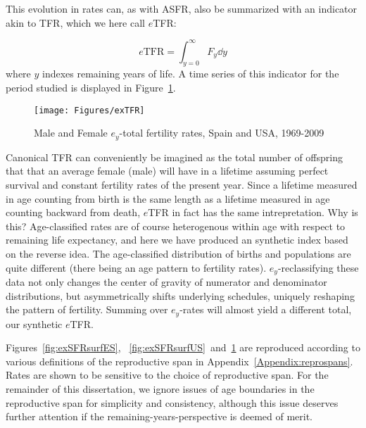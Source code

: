  \FloatBarrier
This evolution in rates can, as with ASFR, also be
summarized with an indicator akin to TFR, which we here call $e$TFR:

\begin{equation}
\label{eq:exTFR}
e\mathrm{TFR} = \int _{y=0}^\infty F_y \dd y
\end{equation}
where $y$ indexes remaining years of life. A time series of this indicator
for the period studied is displayed in Figure~\ref{fig:exTFR}.

\begin{figure}[ht!]
        \centering  
          \caption{Male and Female $e_y$-total fertility rates, Spain
          and USA, 1969-2009}
           \texttt{[image: Figures/exTFR]}
          \label{fig:exTFR}
\end{figure}
Canonical TFR can conveniently be imagined as the total number of
offspring that that an average female (male) will have in a lifetime assuming
perfect survival and constant fertility rates of the present year.
Since a lifetime measured in age counting from birth is the same length as a
lifetime measured in age counting backward from death, $e$TFR in fact has the
same intrepretation. Why is this? Age-classified rates are of course
heterogenous within age with respect to remaining life expectancy, and here we have produced
an synthetic index based on the reverse idea. The age-classified
distribution of births and populations are quite different (there being an age
pattern to fertility rates). $e_y$-reclassifying these data not only changes the
center of gravity of numerator and denominator distributions, but asymmetrically
shifts underlying schedules, uniquely reshaping the pattern of
fertility. Summing over $e_y$-rates will almost yield a different total, our
synthetic $e$TFR. 

Figures~\ref{fig:exSFRsurfES}, ~\ref{fig:exSFRsurfUS}~and~\ref{fig:exTFR} are
reproduced according to various definitions of the reproductive span in
Appendix~\ref{Appendix:reprospans}. Rates are shown to be sensitive to the
choice of reproductive span. For the remainder of this dissertation, we ignore
issues of age boundaries in the reproductive span for simplicity and
consistency, although this issue deserves further attention if the
remaining-years-perspective is deemed of merit.